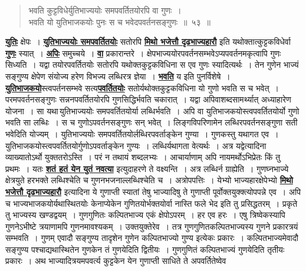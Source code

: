 \documentclass[11pt, openany]{book}
\begin{document}
{{ \label{53}
\begin{quote}
    \ab 
    भवति कुट्टविधेर्युतिभाज्ययोः समपवर्तितयोरपि वा गुणः~। \\
 भवति यो युतिभाजकयोः पुनः स च भवेदपवर्तनसङ्गुणः~॥~५३~॥~
\end{quote}
 
\hyperref[53]{\textbf{युतिः}} क्षेपः~। \hyperref[53]{\textbf{युतिभाज्ययोः समपवर्तितयोः}} सतोरपि \hyperref[51]{\textbf{मिथो भजेत्तौ 
दृढभाज्यहारौ}} इति यथोक्तात्कुट्टकविधेर्वा \hyperref[53]{\textbf{गुणः}} स्यात्~। \hyperref[53]{\textbf{अपिः}}
समुच्चये~। \hyperref[53]{\textbf{वा}}
प्रकारान्तरे~। क्षेपभाज्ययोरपवर्तनसम्भवेऽप्यपवर्तनमकृत्वापि गुणः
सिध्यति~। यद्वा 
तयोरपवर्तितयोः सतोरपि यथोक्तकुट्टकविधिना स एव गुणः स्यादित्यर्थः~। तेन
गुणेन भाज्यं सङ्गुण्य क्षेपेण संयोज्य हरेण विभज्य लब्धिरत्र ज्ञेया~। 
\hyperref[53]{\textbf{भवति}} य इति पुनर्विशेषे~। \hyperref[53]{\textbf{युतिभाजकयो}}स्त्वपर्तनसम्भवे
सत्य\hyperref[53]{\textbf{पवर्तितयोः}} सतोर्यथोक्तकुट्टकविधिना यो गुणो भवति स च भवेत्~। परमपवर्तनसङ्गुणः 
सन्ननपवर्तितयोरपि गुणसिद्धिर्भवति चकारात्~। यद्वा
अपिवाशब्दसामर्थ्यात् अध्याहारेण 
योजना~। सा यथा\textendash \,युतिभाज्ययोः समपवर्तितयोर्या लब्धिर्भवति~। 
अपि वा युतिभाजकयोस्त्वपवर्तितयोर्यो गुणो भवति सा लब्धिः~। स च गुणोऽपवर्तनसङ्गुणः
सन् भवेत्~। लिङ्गविपरिणामेन लब्धिरपवर्तनसङ्गुणा सती भवेदिति योज्यम्~। 
युतिभाज्ययोः समपवर्तितयोर्लब्धिरपवर्ताङ्केन गुण्या~। गुणकस्तु यथागत एव~।
युतिभाजकयोस्त्वपवर्तितयोर्गुणोऽपवर्ताङ्केन गुण्यः~। लब्धिर्यथागता
वेत्यर्थः~। 
अत्र यद्वेत्यादिना व्याख्यातोऽर्थो युक्ततरोऽस्ति~। परं न तथायं शब्दलभ्यः~।
आचार्याणाम् अपि नायमर्थोऽभिप्रेतः किं तु प्रथमः~। यतः \hyperref[61]{\textbf{शतं हतं येन युतं नवत्या}} इत्युदाहरणे ते वक्ष्यन्ति~। अत्र लब्धिर्न ग्राह्येति~। गुणघ्नभाज्ये  क्षेत्रयुते हरभक्ते लब्धिश्चेति च गुणनभजनाल्लब्धिश्चेति च~।
\newpage 
अत्रोपपत्तिः~। येभ्यो भाज्यहारक्षेपेभ्यो \hyperref[51]{\textbf{मिथो भजेत्तौ दृढभाज्यहारौ}}
इत्यादिना  ये गुणाप्ती स्यातां तेषु भाज्यादिषु ते गुणाप्ती
पूर्वोक्तयुक्क्त्योपपन्ने एव~। अपि 
च भाज्यभाजकयोर्यथास्थितयोः केनाप्येकेन गुणितयोर्भक्तयोर्वा नास्ति फले
भेद  इति तु प्रसिद्धतरम्~। प्रकृते तु भाज्यस्य खण्डद्वयम्~। गुणगुणितः
कल्पितभाज्य  एकं क्षेपोऽपरम्~। हर एव हरः~। एषु त्रिष्वेकस्यापि गुणनेऽभीष्टे
त्रयाणामपि गुणनमावश्यकम्~। उक्तयुक्तेरेव~। तत्र गुणगुणितकल्पितभाज्यस्य गुणने
प्रकारत्रयं  सम्भवति~। गुणम् एवादौ सङ्गुण्य तादृशेन गुणेन कल्पितभाज्यो गुण्य इत्येकः 
प्रकारः~। कल्पितभाज्यमेवादौ सङ्गुण्य पश्चाद्यथास्थितेन गुणकेन तं
गुणयेदिति द्वितीयः~। गुणगुणितं कल्पितभाज्यं गुणयेदिति तृतीयः प्रकारः~। अथ 
भाज्यादित्रयमपवर्त्य कुट्टकेन येन गुणाप्ती साधिते ते अपवर्तितेष्वेव
}}
\end{document}
